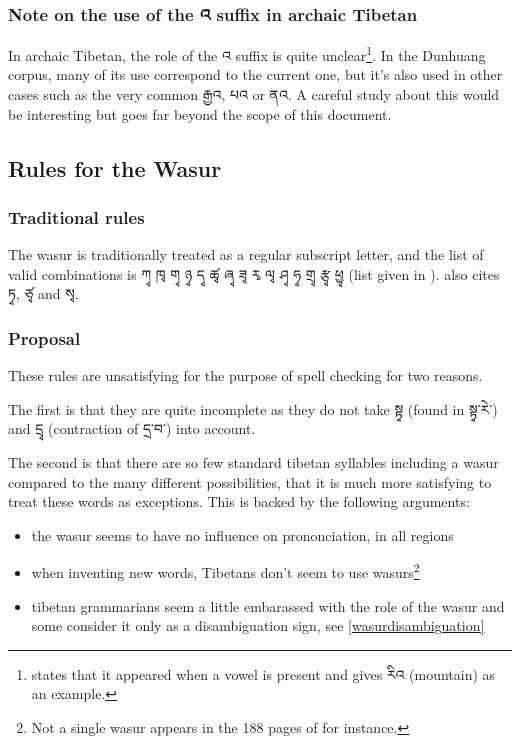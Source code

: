 \documentclass[%
a4paper,%
pagesize,%
12pt,%
parskip=off,%
bibliography=totoc,%
numbers=noenddot,%
DIV=12,%
twoside=semi,%
headings=normal%
]{scrartcl}
\begin{document}
\subsubsection*{Note on the use of the འ suffix in archaic Tibetan}

In archaic Tibetan, the role of the འ suffix is quite unclear\footnote{\cite{TournadreMST} states that it appeared when a vowel is present and gives རིའ (mountain) as an example.}. In the Dunhuang corpus, many of its use correspond to the current one, but it's also used in other cases such as the very common རྒྱའ, པའ or ནའ. A careful study about this would be interesting but goes far beyond the scope of this document.

\subsection{Rules for the Wasur}

\subsubsection*{Traditional rules}

­The wasur is traditionally treated as a regular subscript letter, and the list of valid combinations is ཀྭ ཁྭ གྭ ཉྭ དྭ ཚྭ ཞྭ ཟྭ རྭ ལྭ ཤྭ ཧྭ གྲྭ རྩྭ ཕྱྭ (list given in \cite{TsheshabGrammarTopics}). \cite{TournadreMST} also cites ཏྭ, ཙྭ and སྭ.

\subsubsection*{Proposal}

These rules are unsatisfying for the purpose of spell checking for two reasons.

The first is that they are quite incomplete as they do not take སྟྭ (found in སྟྭ་རེ་) and དྲྭ (contraction of དྲ་བ་) into account.

The second is that there are so few standard tibetan syllables including a wasur compared to the many different possibilities, that it is much more satisfying to treat these words as exceptions. This is backed by the following arguments:

\begin{itemize}
\item the wasur seems to have no influence on prononciation, in all regions
\item when inventing new words, Tibetans don't seem to use wasurs\footnote{Not a single wasur appears in the 188 pages of \cite{TseringIT} for instance.}
\item tibetan grammarians seem a little embarassed with the role of the wasur and some consider it only as a disambiguation sign, see \ref{wasurdisambiguation}
\end{itemize}
\end{document}
